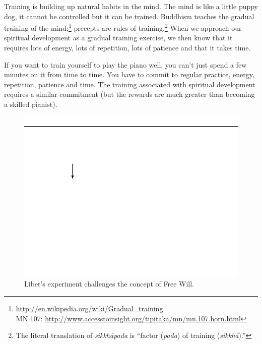 Training is building up natural habits in the mind. The mind is like a little puppy dog, it cannot be controlled but it can be trained. Buddhism teaches the gradual training of the mind;\footnote{\url{http://en.wikipedia.org/wiki/Gradual_training}\\MN 107: \url{http://www.accesstoinsight.org/tipitaka/mn/mn.107.horn.html}} precepts are rules of training.\footnote{The literal translation of \textit{sikkhāpada} is “factor (\textit{pada}) of training (\textit{sikkhā}).”} When we approach our spiritual development as a gradual training exercise, we then know that it requires lots of energy, lots of repetition, lots of patience and that it takes time. 

If you want to train yourself to play the piano well, you can’t just spend a few minutes on it from time to time. You have to commit to regular practice, energy, repetition, patience and time. The training associated with spiritual development requires a similar commitment (but the rewards are much greater than becoming a skilled pianist).

\begin{figure}[h]
\centering
\includegraphics[width=1\linewidth]{./Diagrams/Libet}
\caption{Libet’s experiment challenges the concept of Free Will.}
\label{fig:Libet}
\end{figure}

